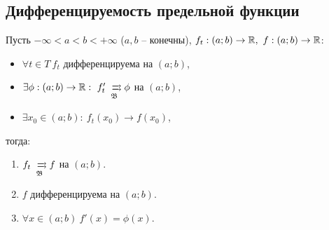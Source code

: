 \subsection{Дифференцируемость предельной функции}

\begin{theorem}\label{theorem:6.9.5}
    Пусть $ -\infty < a < b < +\infty $ ($ a,b $ -- конечны), $ f_t: (a;b)\rightarrow\R, \ f:(a;b) \rightarrow \R $:
    \begin{itemize}
        \item $ \forall t \in T \ f_t $ дифференцируема на $ (a;b) $,
        \item $ \exists \phi: (a;b)\rightarrow\R: \ f_t' \xrightrightarrows[\mathfrak{B}]{} \phi $ на $ (a;b) $,
        \item $ \exists x_0 \in (a;b): \ f_t(x_0) \rightarrow f(x_0) $,
    \end{itemize}
    тогда:
    \begin{enumerate}
        \item $ f_t \xrightrightarrows[\mathfrak{B}]{} f $ на $ (a;b) $.
        \item $ f $ дифференцируема на $ (a;b) $.
        \item $ \forall x \in (a;b) \ f'(x) = \phi(x) $.
    \end{enumerate}
\end{theorem}

